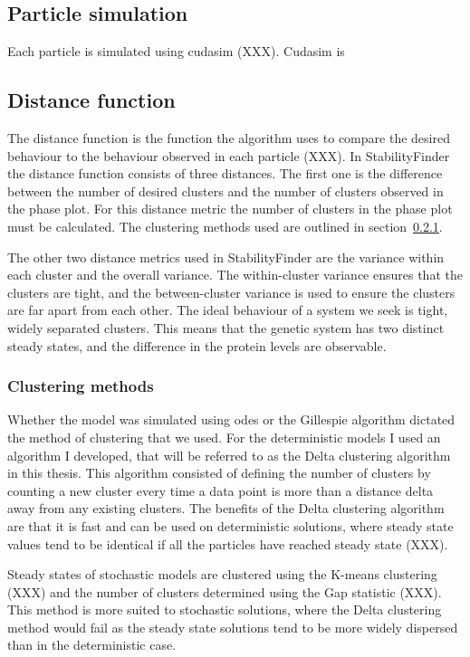{\subsection{Particle simulation}

Each particle is simulated using cudasim (XXX). Cudasim is 

\subsection{Distance function}
 
 The distance function is the function the algorithm uses to compare the desired behaviour to the behaviour observed in each particle (XXX). In StabilityFinder the distance function consists of three distances. The first one is the difference between the number of desired clusters and the number of clusters observed in the phase plot. For this distance metric the number of clusters in the phase plot must be calculated. The clustering methods used are outlined in section~\ref{Clustering methods}.
 
 The other two distance metrics used in StabilityFinder are the variance within each cluster and the overall variance. The within-cluster variance ensures that the clusters are tight, and the between-cluster variance is used to ensure the clusters are far apart from each other. The ideal behaviour of a system we seek is tight, widely separated clusters. This means that the genetic system has two distinct steady states, and the difference in the protein levels are observable.
 
\subsubsection{Clustering methods}
\label{Clustering methods}

Whether the model was simulated using \acrshort{ode}s or the Gillespie algorithm dictated the method of clustering that we used. For the deterministic models I used an algorithm I developed, that will be referred to as the Delta clustering algorithm in this thesis. This algorithm consisted of defining the number of clusters by counting a new cluster every time a data point is more than a distance delta away from any existing clusters. The benefits of the Delta clustering algorithm are that it is fast and can be used on deterministic solutions, where steady state values tend to be identical if all the particles have reached steady state (XXX).

Steady states of stochastic models are clustered using the K-means clustering (XXX) and the number of clusters determined using the Gap statistic (XXX). This method is more suited to stochastic solutions, where the Delta clustering method would fail as the steady state solutions tend to be more widely dispersed than in the deterministic case. 

}
